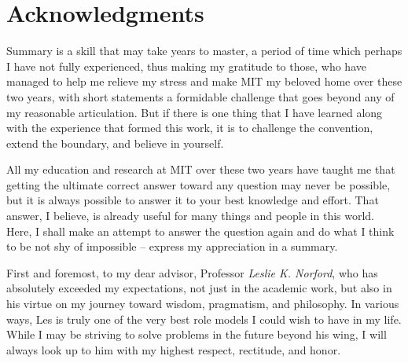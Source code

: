 \cleardoublepage
\setcounter{savepage}{\thepage}
\begin{abstractpage}

\end{abstractpage}

% 

\cleardoublepage

\chapter*{Acknowledgments}

Summary is a skill that may take years to master, a period of time which perhaps I have not fully experienced, thus making my gratitude to those, who have managed to help me relieve my stress and make MIT my beloved home over these two years, with short statements a formidable challenge that goes beyond any of my reasonable articulation. But if there is one thing that I have learned along with the experience that formed this work, it is to challenge the convention, extend the boundary, and believe in yourself.

All my education and research at MIT over these two years have taught me that getting the ultimate correct answer toward any question may never be possible, but it is always possible to answer it to your best knowledge and effort. That answer, I believe, is already useful for many things and people in this world. Here, I shall make an attempt to answer the question again and do what I think to be not shy of impossible -- express my appreciation in a summary.

First and foremost, to my dear advisor, Professor \textit{Leslie K. Norford}, who has absolutely exceeded my expectations, not just in the academic work, but also in his virtue on my journey toward wisdom, pragmatism, and philosophy. In various ways, Les is truly one of the very best role models I could wish to have in my life. While I may be striving to solve problems in the future beyond his wing, I will always look up to him with my highest respect, rectitude, and honor.

